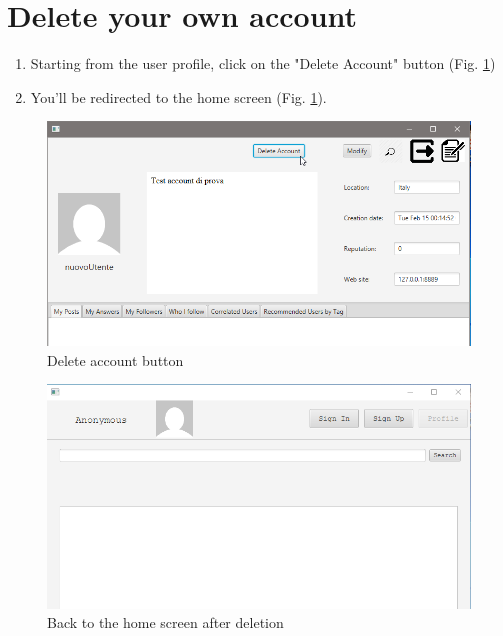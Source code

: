 \documentclass[11pt]{report}
\begin{document}
\section{Delete your own account}
\begin{enumerate}
    \item Starting from the user profile, click on the "Delete Account" button (Fig. \ref{fig:RimuovereUtente1})
    \item You'll be redirected to the home screen (Fig. \ref{fig:RimuovereUtente1}).
\end{enumerate}
\begin{figure}[H]
  \centering
  \includegraphics[width=\textwidth,keepaspectratio=true]{img/user_manual/RimuovereUtente1.png}
  \caption{Delete account button}
  \label{fig:RimuovereUtente1}
\end{figure}
\begin{figure}[H]
  \centering
  \includegraphics[width=\textwidth,keepaspectratio=true]{img/user_manual/RimuovereUtente2.png}
  \caption{Back to the home screen after deletion}
  \label{fig:RimuovereUtente2}
\end{figure}
\end{document}
